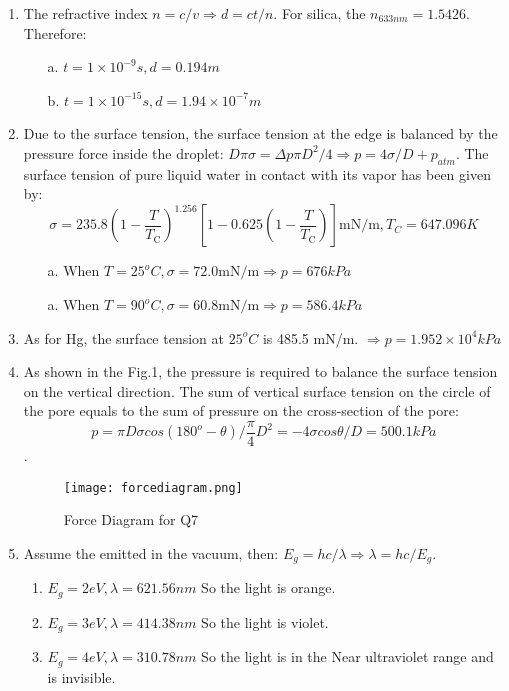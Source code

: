 \begin{enumerate}
   \item The refractive index $n=c/v \Rightarrow d = ct/n$. For silica, the $n_{633nm}=1.5426$. Therefore:
   \begin{enumerate}
       \item[a.] $t=1\times 10^{-9}s, d=0.194m$
       \item[b.] $t=1\times 10^{-15}s, d=1.94\times 10^{-7}m$
   \end{enumerate}
   
   \item Due to the surface tension, the surface tension at the edge is balanced by the pressure force inside the droplet: $D\pi \sigma=\Delta p\pi D^2/4 \Rightarrow p=4\sigma/D+p_{atm}$. The surface tension of pure liquid water in contact with its vapor has been given by:
   $$\sigma=235.8\left(1-\frac{T}{T_{\mathrm{C}}}\right)^{1.256}\left[1-0.625\left(1-\frac{T}{T_{\mathrm{C}}}\right)\right] \mathrm{mN} / \mathrm{m}, T_C = 647.096 K$$
   \begin{enumerate}
       \item[a.] When $T=25^oC, \sigma= 72.0\mathrm{mN} / \mathrm{m} \Rightarrow p=676 kPa$
       \item[a.] When $T=90^oC, \sigma= 60.8\mathrm{mN} / \mathrm{m} \Rightarrow p=586.4 kPa$
   \end{enumerate}
   
   \item As for Hg, the surface tension at $25^oC$ is 485.5 mN/m. $\Rightarrow p= 1.952\times 10^{4}kPa$
   \newpage
   
   \item As shown in the Fig.1, the pressure is required to balance the surface tension on the vertical direction. The sum of vertical surface tension on the circle of the pore equals to the sum of pressure on the cross-section of the pore:
   $$p={\pi D \sigma cos(180^o-\theta)}/{\frac{\pi}{4}D^2}=-4\sigma cos\theta/D=500.1kPa$$.
    
    \begin{figure}[H]
       \centering
       \texttt{[image: forcediagram.png]}
       \caption{Force Diagram for Q7}
       \label{fig:my_label}
   \end{figure}
   
   \item Assume the emitted in the vacuum, then: $E_{g}= hc/\lambda \Rightarrow \lambda = hc/E_{g}$.
   \begin{enumerate}
       \item $E_{g}=2eV, \lambda = 621.56nm$ So the light is orange.
       \item $E_{g}=3eV, \lambda = 414.38nm$ So the light is violet.
       \item $E_{g}=4eV, \lambda = 310.78nm$ So the light is in the Near ultraviolet range and is invisible.
       
   \end{enumerate}
    
 \end{enumerate}



